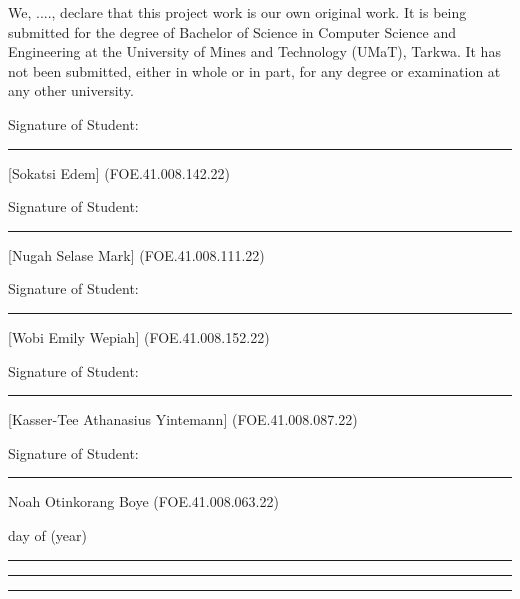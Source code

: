 
\vspace{-20pt}
\begin{declaration}
	\addchaptertocentry{\authorshipname}

	We, ...., declare that this project work is our own original work. It is being submitted for the degree of Bachelor of Science in Computer Science and Engineering at the University of Mines and Technology (UMaT), Tarkwa. It has not been submitted, either in whole or in part, for any degree or examination at any other university.

	\vspace{20pt}

	Signature of Student: \hspace{1.5cm} \rule{9cm}{0.5pt}

	[Sokatsi Edem] (FOE.41.008.142.22)

	\vspace{10pt}

	Signature of Student: \hspace{1.5cm} \rule{9cm}{0.5pt}

	[Nugah Selase Mark] (FOE.41.008.111.22)

	\vspace{10pt}

	Signature of Student: \hspace{1.5cm} \rule{9cm}{0.5pt}

	[Wobi Emily Wepiah] (FOE.41.008.152.22)

	\vspace{10pt}

	Signature of Student: \hspace{1.5cm} \rule{9cm}{0.5pt}

	[Kasser-Tee Athanasius Yintemann] (FOE.41.008.087.22)

	\vspace{1.5cm}

	Signature of Student: \hspace{1.5cm} \rule{9cm}{0.5pt}

	Noah Otinkorang Boye (FOE.41.008.063.22)

	\vspace{1.5cm}

	\hspace{5.3em} day of\vspace{-10pt} \hspace{9em} (year)\vspace{-5pt}

	\noindent \rule[0.5em]{5em}{0.5pt} \hspace{3.5em} \rule[0.5em]{8em}{0.5pt} \hspace{3.2em} \rule[0.5em]{5em}{0.5pt}
\end{declaration}
